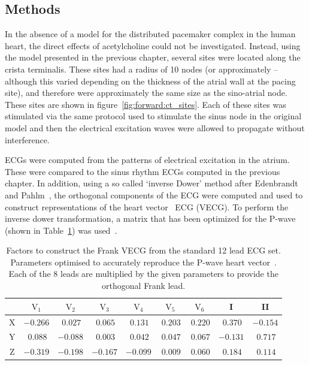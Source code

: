 \subsection{Methods}

In the absence of a model for the distributed pacemaker complex in the human
heart, the direct effects of acetylcholine could not be investigated.
Instead, using the model presented in the previous chapter, several sites were
located along the crista terminalis.
These sites had a radius of 10 nodes (or approximately --although this
varied depending on the thickness of the atrial wall at the pacing site), and
therefore were approximately the same size as the sino-atrial node.
These sites are shown in figure~\ref{fig:forward:ct_sites}.
Each of these sites was stimulated via the same protocol used to stimulate the
sinus node in the original model and then the electrical excitation waves were
allowed to propagate without interference.

ECGs were computed from the patterns of electrical excitation in the atrium.
These were compared to the sinus rhythm ECGs computed in the previous chapter.
In addition, using a so called `inverse Dower' method after Edenbrandt and
Pahlm~\cite{Edenbrandt1988}, the orthogonal components of the ECG were computed
and used to construct representations of the heart
vector~\cite{Frank1956,MacFarlane1989a} ECG (VECG).
To perform the inverse dower transformation, a matrix that has been optimized for
the P-wave (shown in Table~\ref{tbl:forward:idparams}) was
used~\cite{Guillem2007}.


\begin{table}
\caption[Inverse Dower Factors]{
\label{tbl:forward:idparams}
Factors to construct the Frank VECG from the standard 12 lead ECG set.
Parameters optimised to accurately reproduce the P-wave heart
vector~\cite{Guillem2007}.
Each of the 8 leads are multiplied by the given parameters to provide the
orthogonal Frank lead.
}
\begin{center}
\begin{tabular}{c c c c c c c c c}
\toprule
& $\text{V}_{\text{1}}$ &$\text{V}_{\text{2}}$ & $\text{V}_{\text{3}}$ &
$\text{V}_{\text{4}}$ & $\text{V}_{\text{5}}$ & $\text{V}_{\text{6}}$ & I & II \\
\midrule
X & $-0.266$ & $\:0.027$ &  $\:0.065$ & $\:0.131$ & $\:0.203$ & $\:0.220$ & $\:0.370$ & $-0.154$ \\
Y & $\:0.088$ &  $-0.088$ & $\:0.003$ & $\:0.042$ & $\:0.047$ & $\:0.067$ & $-0.131$ & $\:0.717$ \\
Z & $-0.319$ & $-0.198$ & $-0.167$ & $-0.099$ & $\:0.009$ & $\:0.060$ & $\:0.184$ & $\:0.114$ \\
\bottomrule
\end{tabular}
\end{center}
\end{table}

